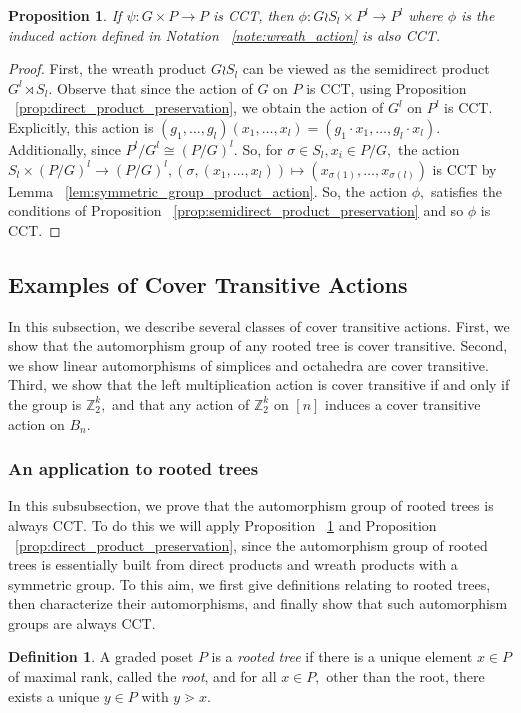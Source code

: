 \documentclass[10 pt]{amsart}
\theoremstyle{plain}
\newtheorem{prop}[thm]{Proposition}
\theoremstyle{definition}
\newtheorem{defn}[thm]{Definition}
\theoremstyle{remark}
\numberwithin{equation}{section}
\newcommand\ssec{\subsection}
\newcommand\sssec{\subsubsection}
\newcommand\BZ{{\mathbb Z}}
\begin{document}
\begin{prop}
\label{prop:wreath_preservation}
If $\psi:G\times P \rightarrow P$ is CCT, then $\phi:G\wr S_l \times P^l \rightarrow P^l$ where $\phi$ is the induced action defined in Notation ~\ref{note:wreath_action} is also CCT.
\end{prop}
\begin{proof}
First, the wreath product $G \wr S_l$ can be viewed as the semidirect product $G^l \rtimes S_l.$ Observe that since the action of $G$ on $P$ is CCT, using Proposition ~\ref{prop:direct_product_preservation}, we obtain the action of $G^l$ on $P^l$ is CCT. Explicitly, this action is $(g_1,\ldots, g_l)(x_1,\ldots, x_l) = (g_1 \cdot x_1,\ldots, g_l \cdot x_l).$ Additionally, since $P^l/G^l \cong (P/G)^l.$ So, for $\sigma \in S_l,x_i \in P/G,$ the action $S_l \times (P/G)^l \rightarrow (P/G)^l,(\sigma ,(x_1,\ldots, x_l)) \mapsto (x_{\sigma(1)},\ldots, x_{\sigma(l)})$ is CCT by Lemma ~\ref{lem:symmetric_group_product_action}. So, the action $\phi,$ satisfies the conditions of Proposition ~\ref{prop:semidirect_product_preservation} and so $\phi$ is CCT.
\end{proof}

\ssec{Examples of Cover Transitive Actions}

In this subsection, we describe several classes of cover transitive actions. First, we show that the automorphism group of any rooted tree is cover transitive. Second, we show linear automorphisms of simplices and octahedra are cover transitive. Third, we show that the left multiplication action is cover transitive if and only if the group is $\BZ_2^k,$ and that any action of $\BZ_2^k$ on $[n]$ induces a cover transitive action on $B_n.$

\sssec{An application to rooted trees}
\label{ssec:rooted_trees}
In this subsubsection, we prove that the automorphism group of rooted trees is always CCT. To do this we will apply Proposition ~\ref{prop:wreath_preservation} and Proposition ~\ref{prop:direct_product_preservation}, since the automorphism group of rooted trees is essentially built from direct products and wreath products with a symmetric group. To this aim, we first give definitions relating to rooted trees, then characterize their automorphisms, and finally show that such automorphism groups are always CCT.

\begin{defn}
A graded poset $P$ is a {\it rooted tree} if there is a unique element $x \in P$ of maximal rank, called the {\it root}, and for all $x \in P,$ other than the root, there exists a unique $y \in P$ with $y \gtrdot x.$
\end{defn}
\end{document}
